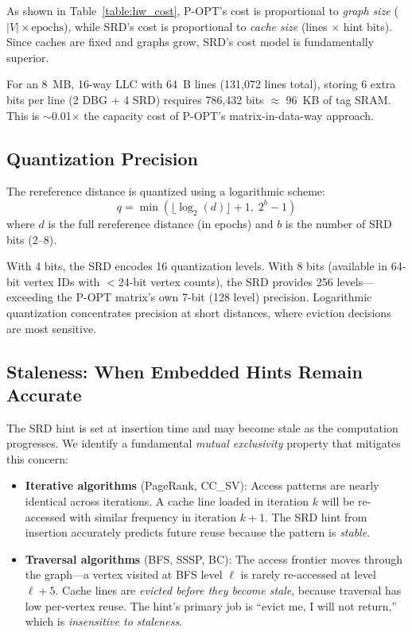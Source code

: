 \documentclass[conference]{IEEEtran}
\begin{document}
As shown in Table~\ref{table:hw_cost}, P-OPT's cost is proportional to \emph{graph size} ($|V| \times \text{epochs}$), while SRD's cost is proportional to \emph{cache size} (lines $\times$ hint bits). Since caches are fixed and graphs grow, SRD's cost model is fundamentally superior.

For an 8~MB, 16-way LLC with 64~B lines (131,072 lines total), storing 6 extra bits per line (2 DBG + 4 SRD) requires 786,432 bits $\approx$ 96~KB of tag SRAM. This is $\sim$0.01$\times$ the capacity cost of P-OPT's matrix-in-data-way approach.

\subsection{Quantization Precision}

The rereference distance is quantized using a logarithmic scheme:
\begin{equation}
    q = \min\left(\lfloor \log_2(d) \rfloor + 1,\; 2^b - 1\right)
\end{equation}
where $d$ is the full rereference distance (in epochs) and $b$ is the number of SRD bits (2--8).

With 4 bits, the SRD encodes 16 quantization levels. With 8 bits (available in 64-bit vertex IDs with $<$24-bit vertex counts), the SRD provides 256 levels---exceeding the P-OPT matrix's own 7-bit (128 level) precision. Logarithmic quantization concentrates precision at short distances, where eviction decisions are most sensitive.

\subsection{Staleness: When Embedded Hints Remain Accurate}

The SRD hint is set at insertion time and may become stale as the computation progresses. We identify a fundamental \emph{mutual exclusivity} property that mitigates this concern:

\begin{itemize}[topsep=2pt,itemsep=0pt,wide]
    \item \textbf{Iterative algorithms} (PageRank, CC\_SV): Access patterns are nearly identical across iterations. A cache line loaded in iteration $k$ will be re-accessed with similar frequency in iteration $k+1$. The SRD hint from insertion accurately predicts future reuse because the pattern is \emph{stable}.
    \item \textbf{Traversal algorithms} (BFS, SSSP, BC): The access frontier moves through the graph---a vertex visited at BFS level $\ell$ is rarely re-accessed at level $\ell+5$. Cache lines are \emph{evicted before they become stale}, because traversal has low per-vertex reuse. The hint's primary job is ``evict me, I will not return,'' which is \emph{insensitive to staleness}.
\end{itemize}
\end{document}
